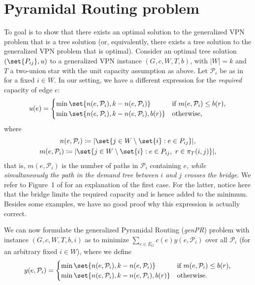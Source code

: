 \documentclass[11pt]{article}
\theoremstyle{definition}
\begin{document}
    \section{Pyramidal Routing problem}
    To goal is to show that there exists an optimal solution to the generalized VPN problem that is a tree solution (or, equivalently, there exists a tree solution to the generalized VPN problem that is optimal).
    Consider an optimal tree solution $(\set{P_{ij}}, u)$ to a generalized VPN instance $(G, c, W, T, b)$, with $|W| = k$ and $T$ a two-union star with the unit capacity assumption as above.
    Let $\mathcal P_i$ be as in \cite{grandoni2008short} for a fixed $i \in W$.
    In our setting, we have a different expression for the \emph{required} capacity of edge $e$:
    \[
        u(e) = \begin{cases}
                   \min\set{n(e, \mathcal P_i), k - n(e, \mathcal P_i)} & \text{if $m(e, \mathcal P_i) \le b(r)$,} \\
                   \min\set{n(e, \mathcal P_i), k - n(e, \mathcal P_i), b(r)} & \text{otherwise,}
        \end{cases}
    \]
    where
    \begin{gather*}
        n(e, \mathcal P_i) \coloneqq |\set{j \in W \setminus \set{i} : e \in P_{ij}}|,\\
        m(e, \mathcal P_i) \coloneqq |\set{j \in W \setminus \set{i} : e \in P_{ij},\ r \in \pi_T(i, j)}|,
    \end{gather*}
    that is, $m(e, \mathcal P_i)$ is the number of paths in $\mathcal P_i$ containing $e$, \emph{while simultaneously the path in the demand tree between $i$ and $j$ crosses the bridge}.
    We refer to Figure~1 of \cite{grandoni2008short} for an explanation of the first case.
    For the latter, notice here that the bridge limits the required capacity and is hence added to the minimum.
    Besides some examples, we have no good proof why this expression is actually correct.

    We can now formulate the generalized Pyramidal Routing (\emph{genPR}) problem with instance $(G, c, W, T, b, i)$ as to minimize $\sum_{e \in E_G} c(e) y(e, \mathcal P_i)$ over all $\mathcal P_i$ (for an arbitrary fixed $i \in W$), where we define
    \[
        y(e, \mathcal P_i) = \begin{cases}
                   \min\set{n(e, \mathcal P_i), k - n(e, \mathcal P_i)} & \text{if $m(e, \mathcal P_i) \le b(r)$,} \\
                   \min\set{n(e, \mathcal P_i), k - n(e, \mathcal P_i), b(r)} & \text{otherwise.}
        \end{cases}
    \]
\end{document}
